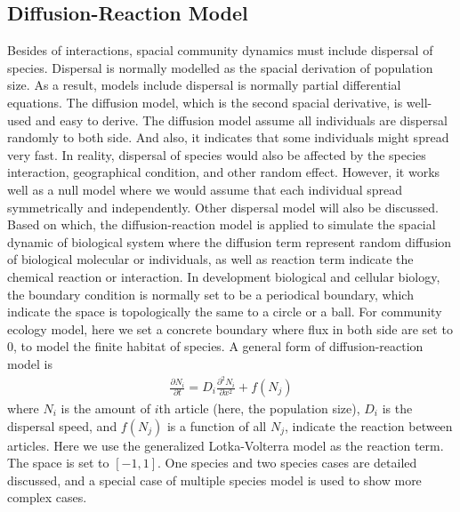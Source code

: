 \subsection{Diffusion-Reaction Model} Besides of interactions, spacial community dynamics must include dispersal of species. Dispersal is normally modelled as the spacial derivation of population size. As a result, models include dispersal is normally partial differential equations. The diffusion model, which is the second spacial derivative, is well-used and easy to derive. The diffusion model assume all individuals are dispersal randomly to both side. And also, it indicates that some individuals might spread very fast. In reality, dispersal of species would also be affected by the species interaction, geographical condition, and other random effect. However, it works well as a null model where we would assume that each individual spread symmetrically and independently. Other dispersal model will also be discussed. Based on which, the diffusion-reaction model is applied to simulate the spacial dynamic of biological system where the diffusion term represent random diffusion of biological molecular or individuals, as well as reaction term indicate the chemical reaction or interaction. In development biological and cellular biology, the boundary condition is normally set to be a periodical boundary, which indicate the space is topologically the same to a circle or a ball. For community ecology model, here we set a concrete boundary where flux in both side are set to $0$, to model the finite habitat of species. A general form of diffusion-reaction model is \begin{equation}\label{eqn:D-R model} \begin{aligned} \frac{\partial N_i}{\partial t} = D_{i}\frac{\partial^2 N_i}{\partial x^2} + f(N_j) \end{aligned} \end{equation} where $N_{i}$ is the amount of $i$th article (here, the population size), $D_{i}$ is the dispersal speed, and $f(N_j)$ is a function of all $N_{j}$, indicate the reaction between articles. Here we use the generalized Lotka-Volterra model as the reaction term. The space is set to $[-1,1]$. One species and two species cases are detailed discussed, and a special case of multiple species model is used to show more complex cases.


